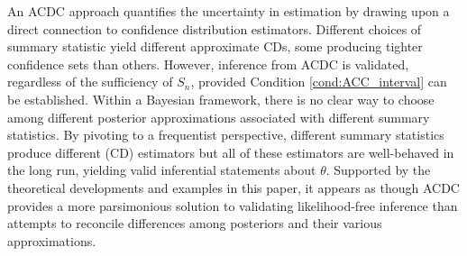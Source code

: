 An ACDC approach quantifies the uncertainty in estimation by drawing upon a direct connection to confidence distribution estimators. Different choices of summary statistic yield different approximate CDs, some producing tighter confidence sets than others. However, inference from ACDC is validated, regardless of the sufficiency of $S_n$, provided Condition \ref{cond:ACC_interval} can be established. Within a Bayesian framework, there is no clear way to choose among different posterior approximations associated with %
different summary statistics. By pivoting to a frequentist perspective, different summary statistics produce different (CD) estimators but all of these estimators are well-behaved in the long run, yielding  valid inferential statements about $\theta$. 
Supported by the theoretical developments and examples in this paper, it appears as though ACDC provides a more parsimonious solution to validating  likelihood-free inference than attempts to reconcile differences among posteriors and their various approximations. %




	



